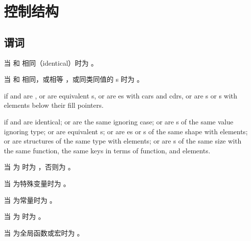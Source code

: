 %
%

\section{控制结构}

\subsection{谓词}
\begin{LIST}{1cm}

  {
  当  和  相同（identical）时为 \retval{\T}。
  }

  {
  当  和 
  相同，或相等 ，或同类同值的
  s 时为 \retval{\T}。
  }

  {
  \retval{\T} if  and 
  are , or are equivalent s, or are es with
   cars and cdrs, or are s or s with
   elements below their fill pointers.
  }

  {
  \retval{\T} if  and  are identical; or are the
  same  ignoring case; or are s of the same
  value ignoring type; or are equivalent s; or are
  es or s of the same shape with 
  elements; or are structures of the same type with
   elements; or are s of the same size
  with the same  function, the same keys in terms of
   function, and  elements.
  }

  {
  当  为 \NIL 时为 \retval{\T}，否则为 \retval{\NIL}。
  }

  {
    当  为特殊变量时为 \retval{\T}。
  }

  {
  当  为常量时为 \retval{\T}。
  }

  {
  当  为  时为 \retval{\T}。
  }

  {
  当  为全局函数或宏时为 \retval{\T}。
  }


\end{LIST}



